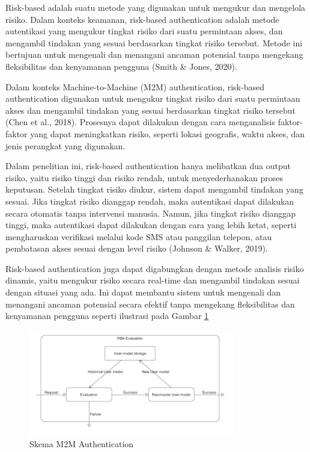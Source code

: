 Risk-based adalah suatu metode yang digunakan untuk mengukur dan mengelola risiko. Dalam konteks keamanan, risk-based authentication adalah metode autentikasi yang mengukur tingkat risiko dari suatu permintaan akses, dan mengambil tindakan yang sesuai berdasarkan tingkat risiko tersebut. Metode ini bertujuan untuk mengenali dan menangani ancaman potensial tanpa mengekang fleksibilitas dan kenyamanan pengguna (Smith \& Jones, 2020). 

Dalam konteks Machine-to-Machine (M2M) authentication, risk-based authentication digunakan untuk mengukur tingkat risiko dari suatu permintaan akses dan mengambil tindakan yang sesuai berdasarkan tingkat risiko tersebut (Chen et al., 2018). Prosesnya dapat dilakukan dengan cara menganalisis faktor-faktor yang dapat meningkatkan risiko, seperti lokasi geografis, waktu akses, dan jenis perangkat yang digunakan. 

Dalam penelitian ini, risk-based authentication hanya melibatkan dua output risiko, yaitu risiko tinggi dan risiko rendah, untuk menyederhanakan proses keputusan. Setelah tingkat risiko diukur, sistem dapat mengambil tindakan yang sesuai. Jika tingkat risiko dianggap rendah, maka autentikasi dapat dilakukan secara otomatis tanpa intervensi manusia. Namun, jika tingkat risiko dianggap tinggi, maka autentikasi dapat dilakukan dengan cara yang lebih ketat, seperti mengharuskan verifikasi melalui kode SMS atau panggilan telepon, atau pembatasan akses sesuai dengan level risiko (Johnson \& Walker, 2019).

Risk-based authentication juga dapat digabungkan dengan metode analisis risiko dinamis, yaitu mengukur risiko secara real-time dan mengambil tindakan sesuai dengan situasi yang ada. Ini dapat membantu sistem untuk mengenali dan menangani ancaman potensial secara efektif tanpa mengekang fleksibilitas dan kenyamanan pengguna seperti ilustrasi pada Gambar \ref*{fig:rba}

\begin{figure}
    \centering
    \includegraphics[width=0.8\textwidth]{BAB_TESIS/IMAGES/rba.png}
    \caption{Skema M2M Authentication}
    \label{fig:rba}
\end{figure}